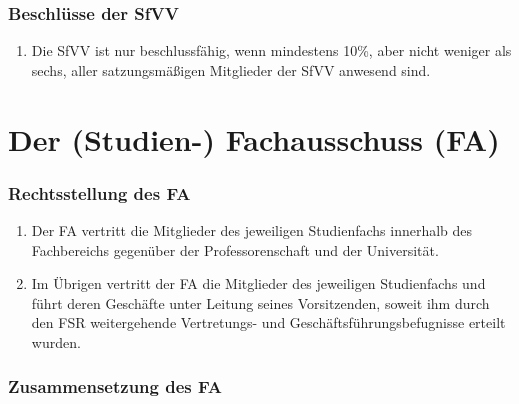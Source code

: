 \documentclass{article}
\begin{document}
\section{Beschlüsse der SfVV}\label{beschluxfcsse-der-sfvv}

\begin{enumerate}[(1)]
	\item Die SfVV ist nur beschlussfähig, wenn mindestens 10\%, aber nicht weniger als sechs, aller satzungsmäßigen Mitglieder der SfVV anwesend sind.
\end{enumerate}

\part{Der (Studien-) Fachausschuss (FA)}\label{iv.-der-studien--fachausschuss-fa}

\section{Rechtsstellung des FA}\label{rechtsstellung-des-fa}

\begin{enumerate}[(1)]
	\item Der FA vertritt die Mitglieder des jeweiligen Studienfachs innerhalb des Fachbereichs gegenüber der Professorenschaft und der Universität.
	\item Im Übrigen vertritt der FA die Mitglieder des jeweiligen Studienfachs und führt deren Geschäfte unter Leitung seines Vorsitzenden, soweit ihm durch den FSR weitergehende Vertretungs- und Geschäftsführungsbefugnisse erteilt wurden.
\end{enumerate}

\section{Zusammensetzung des FA}\label{zusammensetzung-des-fa}
\end{document}

